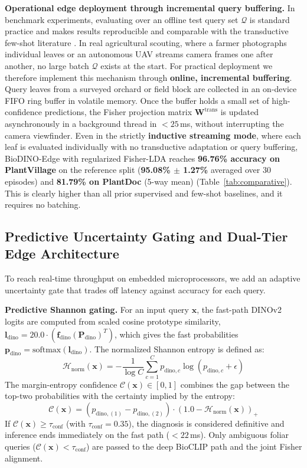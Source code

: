 \documentclass[conference]{IEEEtran}
\begin{document}
\textbf{Operational edge deployment through incremental query buffering.} In benchmark experiments, evaluating over an offline test query set $\mathcal{Q}$ is standard practice and makes results reproducible and comparable with the transductive few-shot literature \cite{boudiaf2020transductive}. In real agricultural scouting, where a farmer photographs individual leaves or an autonomous UAV streams camera frames one after another, no large batch $\mathcal{Q}$ exists at the start. For practical deployment we therefore implement this mechanism through \textbf{online, incremental buffering}. Query leaves from a surveyed orchard or field block are collected in an on-device FIFO ring buffer in volatile memory. Once the buffer holds a small set of high-confidence predictions, the Fisher projection matrix $\mathbf{W}^{\text{trans}}$ is updated asynchronously in a background thread in $<25$\,ms, without interrupting the camera viewfinder. Even in the strictly \textbf{inductive streaming mode}, where each leaf is evaluated individually with no transductive adaptation or query buffering, BioDINO-Edge with regularized Fisher-LDA reaches \textbf{96.76\% accuracy on PlantVillage} on the reference split (\textbf{95.08\% $\pm$ 1.27\%} averaged over 30 episodes) and \textbf{81.79\% on PlantDoc} (5-way mean) (Table~\ref{tab:comparative}). This is clearly higher than all prior supervised and few-shot baselines, and it requires no batching.

\subsection{Predictive Uncertainty Gating and Dual-Tier Edge Architecture}
To reach real-time throughput on embedded microprocessors, we add an adaptive uncertainty gate that trades off latency against accuracy for each query.

\textbf{Predictive Shannon gating.} For an input query $\mathbf{x}$, the fast-path DINOv2 logits are computed from scaled cosine prototype similarity, $\mathbf{l}_{\text{dino}} = 20.0 \cdot (\mathbf{f}_{\text{dino}} (\mathbf{P}_{\text{dino}})^T)$, which gives the fast probabilities $\mathbf{p}_{\text{dino}} = \text{softmax}(\mathbf{l}_{\text{dino}})$. The normalized Shannon entropy is defined as:
\begin{equation}
\mathcal{H}_{\text{norm}}(\mathbf{x}) = -\frac{1}{\log C} \sum_{c=1}^C p_{\text{dino}, c} \log(p_{\text{dino}, c} + \epsilon)
\end{equation}
The margin-entropy confidence $\mathcal{C}(\mathbf{x}) \in [0, 1]$ combines the gap between the top-two probabilities with the certainty implied by the entropy:
\begin{equation}
\mathcal{C}(\mathbf{x}) = \left(p_{\text{dino}, (1)} - p_{\text{dino}, (2)}\right) \cdot \left(1.0 - \mathcal{H}_{\text{norm}}(\mathbf{x})\right)_+
\end{equation}
If $\mathcal{C}(\mathbf{x}) \ge \tau_{\text{conf}}$ (with $\tau_{\text{conf}} = 0.35$), the diagnosis is considered definitive and inference ends immediately on the fast path ($<22$\,ms). Only ambiguous foliar queries ($\mathcal{C}(\mathbf{x}) < \tau_{\text{conf}}$) are passed to the deep BioCLIP path and the joint Fisher alignment.
\end{document}
